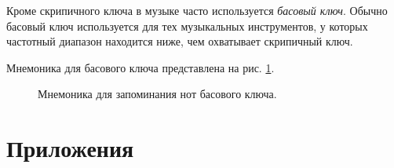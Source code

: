\documentclass[a4paper,twoside]{book}
\begin{document}
Кроме скрипичного ключа в музыке часто используется \emph{басовый ключ}.  Обычно
басовый ключ используется для тех музыкальных инструментов, у которых частотный
диапазон находится ниже, чем охватывает скрипичный ключ.

Мнемоника для басового ключа представлена на
рис. \ref{fig:lilypond-music-graph-2}.

\begin{figure}[ht]
  \caption{Мнемоника для запоминания нот басового ключа.}
  \label{fig:lilypond-music-graph-2}
\end{figure}

\chapter{Приложения}
\end{document}

